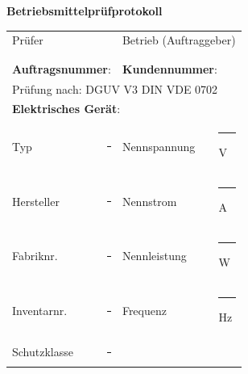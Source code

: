 \documentclass[11pt,a4paper,final,oneside,notitlepage]{report}
\begin{document}
	{\large\textbf{Betriebsmittelprüfprotokoll} } \\
	\vspace{0.02\textwidth}

	\begin{tabularx}{\textwidth}{|p{}|p{}|p{}|p{}|}
		\hline
		\multicolumn{2}{|p{0.475\textwidth}|}{
			Prüfer
		} &
		\multicolumn{2}{p{0.475\textwidth}|}{
			Betrieb (Auftraggeber)
		} \\
		\multicolumn{2}{|p{0.475\textwidth}|}{} &
		\multicolumn{2}{p{0.475\textwidth}|}{} \\
		\multicolumn{2}{|p{0.475\textwidth}|}{} &
		\multicolumn{2}{p{0.475\textwidth}|}{} \\
		\hline
		
		\multicolumn{2}{|p{0.475\textwidth}|}{
			\textbf{Auftragsnummer}:
		} &
		\multicolumn{2}{p{0.475\textwidth}|}{
			\textbf{Kundennummer}:
		} \\
		\hline
		
		\multicolumn{4}{|p{0.9\textwidth}|}{\rule{0pt}{15pt}Prüfung nach: 		\makebox[0pt][l]{$\square$}\raisebox{.15ex}{\hspace{0.1em}}\hspace{0.01\textwidth} DGUV V3\hspace{0.01\textwidth} \makebox[0pt][l]{$\square$}\raisebox{.15ex}{\hspace{0.1em}$\checkmark$} DIN VDE 0702}\\[1.5ex]
		\hline
		
		\multicolumn{4}{|l|}{\rule{0pt}{15pt}\textbf{Elektrisches Gerät}: } \\[.25ex]
		\multicolumn{1}{|l}{
			Typ
		} &
		\multicolumn{1}{l}{
			\rule{0.275\textwidth}{0.05mm} 
		} &
		\multicolumn{1}{|l}{
			Nennspannung
		} &
		\multicolumn{1}{l|}{
			\rule{0.25\textwidth}{0.05mm} V
		} \\
		\multicolumn{1}{|l}{
			Hersteller
		} &
		\multicolumn{1}{l}{
			\rule{0.275\textwidth}{0.05mm} 
		} &
		\multicolumn{1}{|l}{
			Nennstrom
		} &
		\multicolumn{1}{l|}{
			\rule{0.25\textwidth}{0.05mm} A
		} \\
		\multicolumn{1}{|l}{
			Fabriknr.
		} &
		\multicolumn{1}{l}{
			\rule{0.275\textwidth}{0.05mm} 
		} &
		\multicolumn{1}{|l}{
			Nennleistung
		} &
		\multicolumn{1}{l|}{
			\rule{0.25\textwidth}{0.05mm} W
		} \\
		\multicolumn{1}{|l}{
			Inventarnr.
		} &
		\multicolumn{1}{l}{
			\rule{0.275\textwidth}{0.05mm} 
		} &
		\multicolumn{1}{|l}{
			Frequenz
		} &
		\multicolumn{1}{l|}{
			\rule{0.25\textwidth}{0.05mm} Hz
		} \\
		\multicolumn{1}{|l}{
			Schutzklasse
		} &
		\multicolumn{1}{l}{
			\rule{0.275\textwidth}{0.05mm} 
		} &
		\multicolumn{1}{|l}{
			
}
\end{tabularx}
\end{document}
